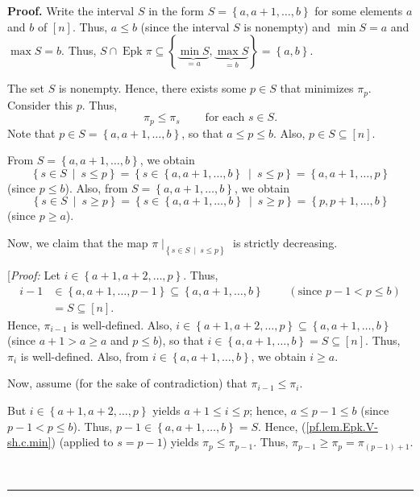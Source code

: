 \documentclass[numbers=enddot,12pt,final,onecolumn,notitlepage]{scrartcl}%
\theoremstyle{definition}
\newenvironment{proof}[1][Proof]{\noindent\textbf{#1.} }{\ \rule{0.5em}{0.5em}}
\newenvironment{verlong}{}{}
\begin{document}
\begin{verlong}
\begin{proof}
Write the interval $S$ in the form $S=\left\{  a,a+1,\ldots,b\right\}  $ for
some elements $a$ and $b$ of $\left[  n\right]  $. Thus, $a\leq b$ (since the
interval $S$ is nonempty) and $\min S=a$ and $\max S=b$. Thus, $S\cap
\operatorname{Epk}\pi\subseteq\left\{  \underbrace{\min S}_{=a}%
,\underbrace{\max S}_{=b}\right\}  =\left\{  a,b\right\}  $.

The set $S$ is nonempty. Hence, there exists some $p\in S$ that minimizes
$\pi_{p}$. Consider this $p$. Thus,%
\begin{equation}
\pi_{p}\leq\pi_{s}\ \ \ \ \ \ \ \ \ \ \text{for each }s\in S.
\label{pf.lem.Epk.V-sh.c.min}%
\end{equation}
Note that $p\in S=\left\{  a,a+1,\ldots,b\right\}  $, so that $a\leq p\leq b$.
Also, $p\in S\subseteq\left[  n\right]  $.

From $S=\left\{  a,a+1,\ldots,b\right\}  $, we obtain%
\[
\left\{  s\in S\ \mid\ s\leq p\right\}  =\left\{  s\in\left\{  a,a+1,\ldots
,b\right\}  \ \mid\ s\leq p\right\}  =\left\{  a,a+1,\ldots,p\right\}
\]
(since $p\leq b$). Also, from $S=\left\{  a,a+1,\ldots,b\right\}  $, we obtain%
\[
\left\{  s\in S\ \mid\ s\geq p\right\}  =\left\{  s\in\left\{  a,a+1,\ldots
,b\right\}  \ \mid\ s\geq p\right\}  =\left\{  p,p+1,\ldots,b\right\}
\]
(since $p \geq a$).


Now, we claim that the map $\pi\mid_{\left\{  s\in S\ \mid\ s\leq p\right\}
}$ is strictly decreasing.

[\textit{Proof:} Let $i\in\left\{  a+1,a+2,\ldots,p\right\}  $. Thus,
\begin{align*}
i-1  &  \in\left\{  a,a+1,\ldots,p-1\right\}  \subseteq\left\{  a,a+1,\ldots
,b\right\}  \ \ \ \ \ \ \ \ \ \ \left(  \text{since }p-1<p\leq b\right) \\
&  =S\subseteq\left[  n\right]  .
\end{align*}
Hence, $\pi_{i-1}$ is well-defined. Also, $i\in\left\{  a+1,a+2,\ldots
,p\right\}  \subseteq\left\{  a,a+1,\ldots,b\right\}  $ (since $a+1>a\geq a$
and $p\leq b$), so that $i\in\left\{  a,a+1,\ldots,b\right\}  =S\subseteq
\left[  n\right]  $. Thus, $\pi_{i}$ is well-defined. Also, from $i\in\left\{
a,a+1,\ldots,b\right\}  $, we obtain $i\geq a$.

Now, assume (for the sake of contradiction) that $\pi_{i-1}\leq\pi_{i}$.

But
$i\in\left\{  a+1,a+2,\ldots,p\right\}  $ yields $a+1\leq i\leq p$; hence,
$a\leq p-1\leq b$ (since $p-1<p\leq b$). Thus, $p-1\in\left\{  a,a+1,\ldots
,b\right\}  =S$. Hence, (\ref{pf.lem.Epk.V-sh.c.min}) (applied to $s=p-1$)
yields $\pi_{p}\leq\pi_{p-1}$. Thus, $\pi_{p-1}\geq\pi_{p}=\pi_{\left(
p-1\right)  +1}$.


\end{proof}
\end{verlong}
\end{document}
